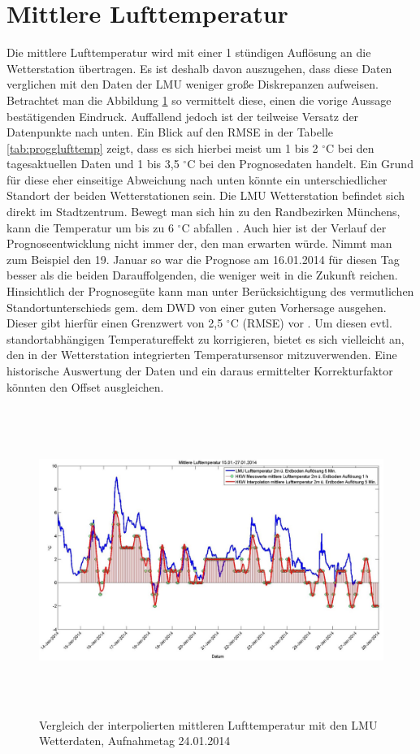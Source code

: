 \section{Mittlere Lufttemperatur}
Die mittlere Lufttemperatur wird mit einer 1 stündigen Auflösung an die Wetterstation übertragen. Es ist deshalb davon auszugehen, dass diese Daten verglichen mit den Daten der LMU weniger große Diskrepanzen aufweisen. Betrachtet man die Abbildung \ref{fig:mittlufttemp} so vermittelt diese, einen die vorige Aussage bestätigenden Eindruck. Auffallend jedoch ist der teilweise Versatz der Datenpunkte nach unten. Ein Blick auf den RMSE in der Tabelle \ref{tab:progglufttemp} zeigt, dass es sich hierbei meist um 1 bis 2 $^\circ$C bei den tagesaktuellen Daten und 1 bis 3,5 $^\circ$C bei den Prognosedaten handelt. Ein Grund für diese eher einseitige Abweichung nach unten könnte ein unterschiedlicher Standort der beiden Wetterstationen sein. Die LMU Wetterstation befindet sich direkt im Stadtzentrum. Bewegt man sich hin zu den Randbezirken Münchens, kann die Temperatur um bis zu 6 $^\circ$C abfallen \cite{stadtklima}. Auch hier ist der Verlauf der Prognoseentwicklung nicht immer der, den man erwarten würde. Nimmt man zum Beispiel den 19. Januar so war die Prognose am 16.01.2014 für diesen Tag besser als die beiden Darauffolgenden, die weniger weit in die Zukunft reichen. Hinsichtlich der Prognosegüte kann man unter Berücksichtigung des vermutlichen Standortunterschieds gem. dem DWD von einer guten Vorhersage ausgehen. Dieser gibt hierfür einen Grenzwert von 2,5 $^\circ$C (RMSE) vor \cite{DWD}. Um diesen evtl. standortabhängigen Temperatureffekt zu korrigieren, bietet es sich vielleicht an, den in der Wetterstation integrierten Temperatursensor mitzuverwenden. Eine historische Auswertung der Daten und ein daraus ermittelter Korrekturfaktor könnten den Offset ausgleichen.        
\begin{figure}[h]
\centering
\includegraphics[width=16cm,height=10cm]{analyse/mittlufttemp2}
\caption{Vergleich der interpolierten mittleren Lufttemperatur mit den LMU Wetterdaten, Aufnahmetag 24.01.2014}
\label{fig:mittlufttemp}
\end{figure}
